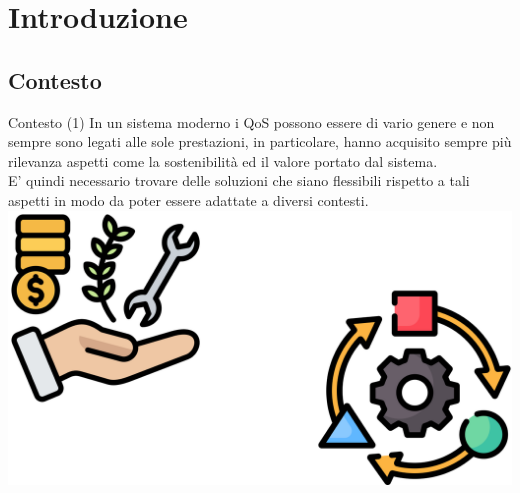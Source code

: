 \documentclass[compress]{beamer}
\begin{document}
\begin{frame}[plain]
    \titlepage
\end{frame}

\section*{Introduzione}

\subsection*{Contesto}
\begin{frame}{Contesto (1)}
    In un sistema moderno i QoS possono essere di vario genere e non sempre sono legati alle sole prestazioni, in particolare, hanno acquisito sempre più rilevanza aspetti come la sostenibilità ed il valore portato dal sistema.\\ E' quindi necessario trovare delle soluzioni che siano flessibili rispetto a tali aspetti in modo da poter essere adattate a diversi contesti.
    \vspace{2cm}
    \begin{adjustbox}{margin=0.4cm 0cm 0cm 0.65cm, center} %
        \includegraphics[width=.6\textwidth]{figs/qos_adapt.png}
    \end{adjustbox}
\end{frame}
\end{document}
